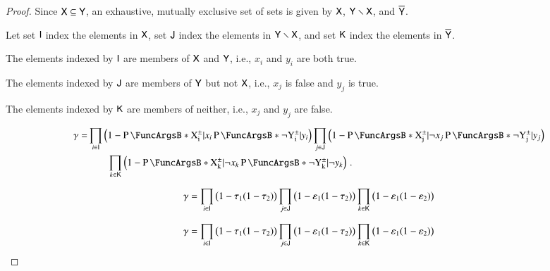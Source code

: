 \documentclass[10pt,final,hidelinks]{article}
\numberwithin{equation}{section}
\providecommand{\Given}{\vert}
\newcommand{\tprate}{\tau}
\newcommand{\fprate}{\varepsilon}
\theoremstyle{plain}
\begin{document}
\begin{proof}
	Since $\Set{X} \subseteq \Set{Y}$, an exhaustive, mutually exclusive set of 
	sets is given by $\Set{X}$, $\SetDiff[\Set{Y}][\Set{X}]$, and 
	$\SetComplement[\Set{Y}]$.
	
	Let set $\Set{I}$ index the elements in $\Set{X}$, set $\Set{J}$ index 
	the elements in $\SetDiff[\Set{Y}][\Set{X}]$, and set $\Set{K}$ index the 
	elements in $\SetComplement[\Set{Y}]$.
	
	The elements indexed by $\Set{I}$ are members of $\Set{X}$ and $\Set{Y}$, i.e.,
	$x_i$ and $y_i$ are both true.
	
	The elements indexed by $\Set{J}$ are members of $\Set{Y}$ but not $\Set{X}$,
	i.e., $x_j$ is false and $y_j$ is true.
	
	The elements indexed by $\Set{K}$ are members of neither, i.e., $x_j$ and $y_j$
	are false.
	
	
	\begin{equation}
	\begin{split}
	\gamma =
	&\prod_{i \in \Set{I}}
	\left(1-\Prob{\AVecComp{X}[i] \Given x_i}
	\Prob{\neg \AVecComp{Y}[i] \Given y_i}\right)
	\prod_{j \in \Set{J}}
	\left(1-\Prob{\AVecComp{X}[j] \Given \neg x_j}
	\Prob{\neg \AVecComp{Y}[j] \Given y_j}\right)\\
	&\qquad \prod_{k \in \Set{K}}
	\left(1-\Prob{\AVecComp{X}[k] \Given \neg x_k}
	\Prob{\neg \AVecComp{Y}[k] \Given \neg y_k}\right)\,.  
	\end{split}    
	\end{equation}
	
	
	
	\begin{equation}
	\gamma =
	\prod_{i \in \Set{I}}
	\left(1 - \tprate_1
	(1 - \tprate_2)\right)
	\prod_{j \in \Set{J}}
	\left(1 - \fprate_1
	(1 - \tprate_2)\right)
	\prod_{k \in \Set{K}}
	\left(1 - \fprate_1
	(1 - \fprate_2)\right)
	\end{equation}
	
	
	
	\begin{equation}
	\gamma =
	\prod_{i \in \Set{I}}
	\left(1 - \tprate_1
	(1 - \tprate_2)\right)
	\prod_{j \in \Set{J}}
	\left(1 - \fprate_1
	(1 - \tprate_2)\right)
	\prod_{k \in \Set{K}}
	\left(1 - \fprate_1
	(1 - \fprate_2)\right)
	\end{equation}
	
	
	

\end{proof}
\end{document}
